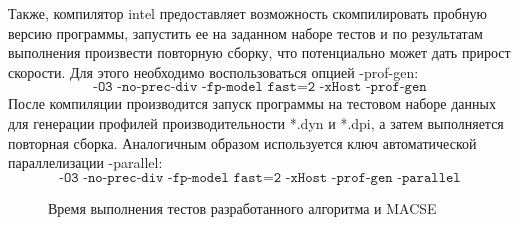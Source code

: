 Также, компилятор intel предоставляет возможность скомпилировать пробную версию программы, запустить ее на заданном наборе тестов и по результатам выполнения произвести повторную сборку, что потенциально может дать прирост скорости. Для этого необходимо воспользоваться опцией -prof-gen:
\begin{equation*}
\texttt{-O3 -no-prec-div -fp-model fast=2 -xHost -prof-gen}
\end{equation*}
После компиляции производится запуск программы на тестовом наборе данных для генерации профилей производительности *.dyn и *.dpi, а затем выполняется повторная сборка. Аналогичным образом используется ключ автоматической параллелизации -parallel:
\begin{equation*}
\texttt{-O3 -no-prec-div -fp-model fast=2 -xHost -prof-gen -parallel}
\end{equation*}  

\begin{landscape}
\begin{figure}[h]
	\caption{Время выполнения тестов разработанного алгоритма и MACSE}
	\label{ris:gist}
\end{figure}
\end{landscape}

